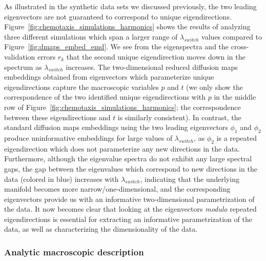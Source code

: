 As illustrated in the synthetic data sets we discussed previously, the two leading eigenvectors are not guaranteed to correspond to unique eigendirections.
%
Figure~\ref{fig:chemotaxis_simulations_harmonics} shows the results of analyzing three different simulations which span a larger range of $\lambda_{switch}$ values compared to Figure~\ref{fig:dmaps_embed_emd}.
%
We see from the eigenspectra and the cross-validation errors $r_k$ that the second unique eigendirection moves down in the spectrum as $\lambda_{switch}$ increases.
%
The two-dimensional reduced diffusion maps embeddings obtained from eigenvectors which parameterize unique eigendirections capture the macroscopic variables $p$ and $t$ (we only show the correspondence of the two identified unique eigendirections with $p$ in the middle row of Figure~\ref{fig:chemotaxis_simulations_harmonics}; the correspondence between these eigendirections and $t$ is similarly consistent).
%
In contrast, the standard diffusion maps embeddings using the two leading eigenvectors $\phi_1$ and $\phi_2$ produce uninformative embeddings for large values of $\lambda_{switch}$, as $\phi_2$ is a repeated eigendirection which does not parameterize any new directions in the data.
%
Furthermore, although the eigenvalue spectra do not exhibit any large spectral gaps, the gap between the eigenvalues which correspond to new directions in the data (colored in blue) increases with $\lambda_{switch}$, indicating that the underlying manifold becomes more narrow/one-dimensional, and the corresponding eigenvectors provide us with an informative two-dimensional parametrization of the data. %
%
It now becomes clear that looking at the eigenvectors {\em modulo} repeated eigendirections is essential for extracting an informative parametrization of the data, as well as characterizing the dimensionality of the data.

\subsubsection{Analytic macroscopic description}

